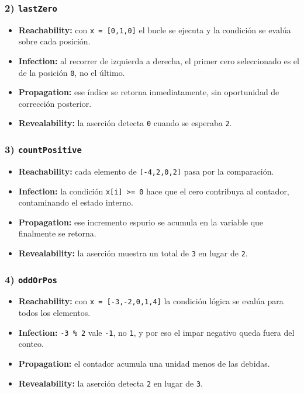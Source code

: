 \documentclass[12pt,a4paper]{article}
\begin{document}
\subsubsection*{2) \texttt{lastZero}}
\begin{itemize}
  \item \textbf{Reachability:} con \texttt{x = [0,1,0]} el bucle se ejecuta y la condición se evalúa sobre cada posición.
  \item \textbf{Infection:} al recorrer de izquierda a derecha, el primer cero seleccionado es el de la posición \texttt{0}, no el último.
  \item \textbf{Propagation:} ese índice se retorna inmediatamente, sin oportunidad de corrección posterior.
  \item \textbf{Revealability:} la aserción detecta \texttt{0} cuando se esperaba \texttt{2}.
\end{itemize}

\subsubsection*{3) \texttt{countPositive}}
\begin{itemize}
  \item \textbf{Reachability:} cada elemento de \texttt{[-4,2,0,2]} pasa por la comparación.
  \item \textbf{Infection:} la condición \texttt{x[i] >= 0} hace que el cero contribuya al contador, contaminando el estado interno.
  \item \textbf{Propagation:} ese incremento espurio se acumula en la variable que finalmente se retorna.
  \item \textbf{Revealability:} la aserción muestra un total de \texttt{3} en lugar de \texttt{2}.
\end{itemize}

\subsubsection*{4) \texttt{oddOrPos}}
\begin{itemize}
  \item \textbf{Reachability:} con \texttt{x = [-3,-2,0,1,4]} la condición lógica se evalúa para todos los elementos.
  \item \textbf{Infection:} \texttt{-3 \% 2} vale \texttt{-1}, no \texttt{1}, y por eso el impar negativo queda fuera del conteo.
  \item \textbf{Propagation:} el contador acumula una unidad menos de las debidas.
  \item \textbf{Revealability:} la aserción detecta \texttt{2} en lugar de \texttt{3}.
\end{itemize}
\end{document}

